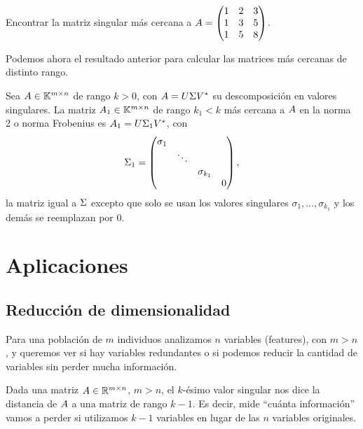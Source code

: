 \begin{ejercicio}
Encontrar la matriz singular más cercana a $\Ab = \begin{pmatrix} 1 & 2 & 3 \\ 1 & 3 & 5 \\ 1 & 5 & 8\end{pmatrix}$.
\end{ejercicio}

Podemos ahora el resultado anterior para calcular las matrices más cercanas de distinto rango.

\begin{teo}
Sea $\Ab \in \K^{m \times n}$ de rango $k > 0$, con $\Ab = \Ub \Sigmab \Vb^*$ su descomposición en valores singulares. La matriz $\Ab_1 \in \K^{m \times n}$ de rango $k_1 < k$ más cercana a $\Ab$ en la norma 2 o norma Frobenius es $\Ab_1 = \Ub \Sigmab_{1} \Vb^*$, con
$$\Sigmab_{1} =
\begin{pmatrix}
\sigma_1 & & & \\
 & \ddots & & \\
 & & \sigma_{k_1} & \\
 & &  & 0
\end{pmatrix},
$$
la matriz igual a $\Sigmab$ excepto que solo se usan los valores singulares $\sigma_1, \dots, \sigma_{k_1}$ y los demás se reemplazan por 0.
\end{teo}


\section{Aplicaciones}

\subsection{Reducción de dimensionalidad}

Para una población de $m$ individuos analizamos $n$ variables (features), con $m > n$, y queremos ver si hay variables redundantes o si podemos reducir la cantidad de variables sin perder mucha información.

Dada una matriz $\Ab \in \R^{m \times n}$, $m > n$, el $k$-\'esimo valor singular nos dice la distancia de $\Ab$ a una matriz de rango $k-1$.
Es decir, mide ``cuánta información'' vamos a perder si utilizamos $k-1$ variables en lugar de las $n$ variables originales.

